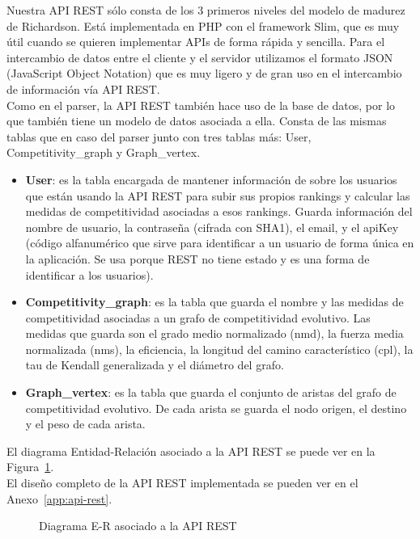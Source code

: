 Nuestra API REST sólo consta de los 3 primeros niveles del modelo de madurez de Richardson. Está implementada en PHP con el framework Slim, que es muy útil cuando se quieren implementar APIs de forma rápida y sencilla. Para el intercambio de datos entre el cliente y el servidor utilizamos el formato JSON (JavaScript Object Notation) que es muy ligero y de gran uso en el intercambio de información vía API REST.\\

Como en el parser, la API REST también hace uso de la base de datos, por lo que también tiene un modelo de datos asociada a ella. Consta de las mismas tablas que en caso del parser junto con tres tablas más: User, Competitivity\_graph y Graph\_vertex.

\begin{itemize}
\item \textbf{User}: es la tabla encargada de mantener información de sobre los usuarios que están usando la API REST para subir sus propios rankings y calcular las medidas de competitividad asociadas a esos rankings. Guarda información del nombre de usuario, la contraseña (cifrada con SHA1), el email, y el apiKey (código alfanumérico que sirve para identificar a un usuario de forma única en la aplicación. Se usa porque REST no tiene estado y es una forma de identificar a los usuarios).

\item \textbf{Competitivity\_graph}: es la tabla que guarda el nombre y las medidas de competitividad asociadas a un grafo de competitividad evolutivo. Las medidas que guarda son el grado medio normalizado (nmd), la fuerza media normalizada (nms), la eficiencia, la longitud del camino característico (cpl), la tau de Kendall generalizada y el diámetro del grafo.

\item \textbf{Graph\_vertex}: es la tabla que guarda el conjunto de aristas del grafo de competitividad evolutivo. De cada arista se guarda el nodo origen, el destino y el peso de cada arista.
\end{itemize}

El diagrama Entidad-Relación asociado a la API REST se puede ver en la Figura~\ref{fig:er-api}.\\

El diseño completo de la API REST implementada se pueden ver en el Anexo~\ref{app:api-rest}.

\begin{figure}[htb]
\centering
\erapi
\caption{Diagrama E-R asociado a la API REST}
\label{fig:er-api}
\end{figure}


